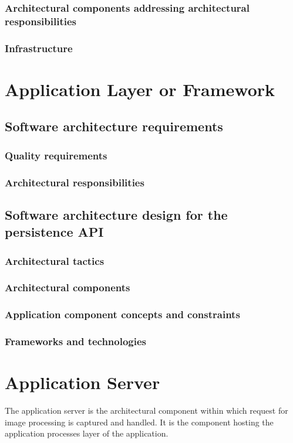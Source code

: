 \documentclass[a4paper,12pt]{report}
\begin{document}
\subsubsection {Architectural components addressing architectural responsibilities}

\subsubsection {Infrastructure}

\section {Application Layer or Framework}
\subsection {Software architecture requirements}
\subsubsection {Quality requirements}
\subsubsection {Architectural responsibilities}

\subsection {Software architecture design for the persistence API}
\subsubsection {Architectural tactics}
\subsubsection {Architectural components}
\subsubsection {Application component concepts and constraints}
\subsubsection {Frameworks and technologies}

\section {Application Server}
The application server is the architectural component within which request for image processing is captured and handled. It is the component hosting the application processes layer of the application.
\end{document}
